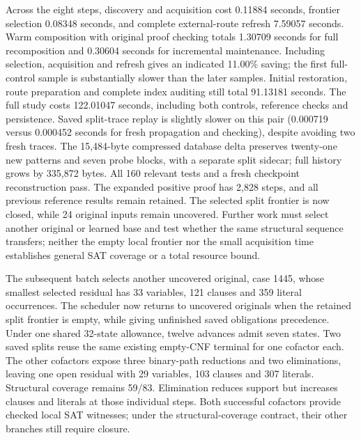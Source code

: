 \documentclass[11pt,a4paper]{article}
\numberwithin{equation}{section}
\theoremstyle{plain}
\theoremstyle{definition}
\theoremstyle{remark}
\begin{document}
Across the eight steps, discovery and acquisition cost 0.11884 seconds, frontier selection 0.08348 seconds, and complete external-route refresh 7.59057 seconds. Warm composition with original proof checking totals 1.30709 seconds for full recomposition and 0.30604 seconds for incremental maintenance. Including selection, acquisition and refresh gives an indicated 11.00\% saving; the first full-control sample is substantially slower than the later samples. Initial restoration, route preparation and complete index auditing still total 91.13181 seconds. The full study costs 122.01047 seconds, including both controls, reference checks and persistence. Saved split-trace replay is slightly slower on this pair (0.000719 versus 0.000452 seconds for fresh propagation and checking), despite avoiding two fresh traces. The 15,484-byte compressed database delta preserves twenty-one new patterns and seven probe blocks, with a separate split sidecar; full history grows by 335,872 bytes. All 160 relevant tests and a fresh checkpoint reconstruction pass. The expanded positive proof has 2,828 steps, and all previous reference results remain retained. The selected split frontier is now closed, while 24 original inputs remain uncovered. Further work must select another original or learned base and test whether the same structural sequence transfers; neither the empty local frontier nor the small acquisition time establishes general SAT coverage or a total resource bound.

The subsequent batch selects another uncovered original, case 1445, whose smallest selected residual has 33 variables, 121 clauses and 359 literal occurrences. The scheduler now returns to uncovered originals when the retained split frontier is empty, while giving unfinished saved obligations precedence. Under one shared 32-state allowance, twelve advances admit seven states. Two saved splits reuse the same existing empty-CNF terminal for one cofactor each. The other cofactors expose three binary-path reductions and two eliminations, leaving one open residual with 29 variables, 103 clauses and 307 literals. Structural coverage remains 59/83. Elimination reduces support but increases clauses and literals at those individual steps. Both successful cofactors provide checked local SAT witnesses; under the structural-coverage contract, their other branches still require closure.
\end{document}
